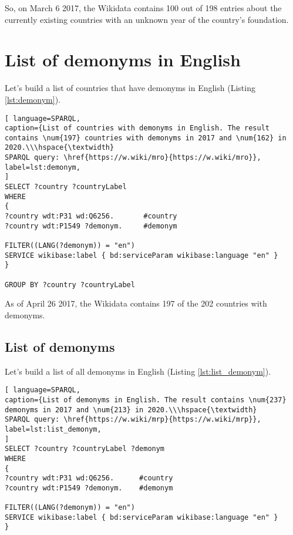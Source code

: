 So, on March 6 2017, the Wikidata contains 100 out of 198 entries about the currently existing countries with an unknown year of the country's foundation.

\section{List of demonyms in English}

Let's build a list of countries that have demonyms in English (Listing \ref{lst:demonym}).

\begin{lstlisting}[ language=SPARQL, 
caption={List of countries with demonyms in English. The result contains \num{197} countries with demonyms in 2017 and \num{162} in 2020.\\\hspace{\textwidth}
SPARQL query: \href{https://w.wiki/mro}{https://w.wiki/mro}},
label=lst:demonym, 
]
SELECT ?country ?countryLabel 
WHERE
{
?country wdt:P31 wd:Q6256.       #country
?country wdt:P1549 ?demonym.     #demonym

FILTER((LANG(?demonym)) = "en")
SERVICE wikibase:label { bd:serviceParam wikibase:language "en" }
}

GROUP BY ?country ?countryLabel
\end{lstlisting}


As of April 26 2017, the Wikidata contains 197 of the 202 countries with demonyms.

\subsection{List of demonyms}

Let's build a list of all demonyms in English (Listing \ref{lst:list_demonym}).

\begin{lstlisting}[ language=SPARQL, 
caption={List of demonyms in English. The result contains \num{237} demonyms in 2017 and \num{213} in 2020.\\\hspace{\textwidth}
SPARQL query: \href{https://w.wiki/mrp}{https://w.wiki/mrp}},
label=lst:list_demonym, 
]
SELECT ?country ?countryLabel ?demonym
WHERE
{
?country wdt:P31 wd:Q6256.      #country
?country wdt:P1549 ?demonym.    #demonym

FILTER((LANG(?demonym)) = "en")
SERVICE wikibase:label { bd:serviceParam wikibase:language "en" }
}
\end{lstlisting}

